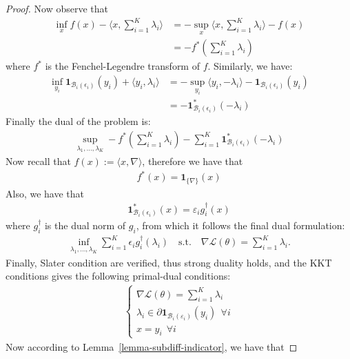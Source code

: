 \begin{proof}
Now observe that
\begin{align*}
    \inf_{x} f(x) - \langle x,\sum_{i=1}^K\lambda_i\rangle &= -\sup_{x}\langle x,\sum_{i=1}^K\lambda_i\rangle - f(x)\\
    &=-f^*(\sum_{i=1}^K\lambda_i)
\end{align*}
where $f^*$ is the Fenchel-Legendre transform of $f$. Similarly, we have:
\begin{align*}
     \inf_{y_i} \bm{1}_{\mathcal{B}_i(\epsilon_i)}(y_i) + \langle y_i, \lambda_i\rangle &= -\sup_{y_i}\langle y_i,-\lambda_i\rangle - \bm{1}_{\mathcal{B}_i(\epsilon_i)}(y_i)\\
    &=-\bm{1}_{\mathcal{B}_i(\epsilon_i)}^*(-\lambda_i)
\end{align*}
Finally the dual of the problem is:
\begin{align*}
   \sup_{\lambda_1,\dots,\lambda_K} -f^*(\sum_{i=1}^K\lambda_i) -\sum_{i=1}^K \bm{1}_{\mathcal{B}_i(\epsilon_i)}^*(-\lambda_i)
\end{align*}
Now recall that $f(x):=\langle x, \nabla\rangle$, therefore we have that
\begin{align*}
    f^*(x)=\bm{1}_{\{\nabla\}}(x)
\end{align*}
Also, we have that
\begin{align*}
\bm{1}_{\mathcal{B}_i(\epsilon_i)}^*(x)=\varepsilon_i g_i^\dagger(x)
\end{align*}
where $g_i^\dagger$ is the dual norm of $g_i$, from which it follows the final dual formulation:
\begin{align*}
\inf_{\lambda_1,\dots,\lambda_K}\sum_{i=1}^K \epsilon_i g^\dagger_i(\lambda_i)\quad\text{s.t.}\quad \nabla\mathcal{L}(\theta) = \sum_{i=1}^K \lambda_i.
\end{align*}
Finally, Slater condition are verified, thus strong duality holds, and the KKT conditions gives the following primal-dual conditions:
\begin{align*}
    \begin{cases} 
          \nabla\mathcal{L}(\theta)=\sum_{i=1}^K \lambda_i\\
          \lambda_i\in\partial\bm{1}_{\mathcal{B}_i(\varepsilon_i)}(y_i)~~\forall i\\
          x=y_i~~\forall i
       \end{cases}
\end{align*}
Now according to Lemma~\ref{lemma-subdiff-indicator}, we have that



\end{proof}

